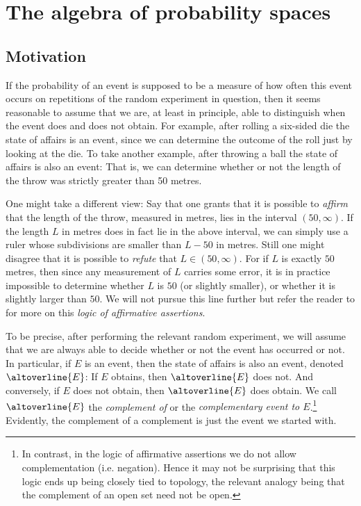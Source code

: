 \documentclass[article, a4paper, 11pt, oneside]{memoir}
\numberwithin{equation}{chapter}
\begin{document}
\chapter{The algebra of probability spaces}

\section{Motivation}

\newcommand{\compl}[1]{\altoverline{#1}}

If the probability of an event is supposed to be a measure of how often this event occurs on repetitions of the random experiment in question, then it seems reasonable to assume that we are, at least in principle, able to distinguish when the event does and does not obtain. For example, after rolling a six-sided die the state of affairs  is an event, since we can determine the outcome of the roll just by looking at the die. To take another example, after throwing a ball the state of affairs  is also an event: That is, we can determine whether or not the length of the throw was strictly greater than 50 metres.

One might take a different view: Say that one grants that it is possible to \emph{affirm} that the length of the throw, measured in metres, lies in the interval $(50,\infty)$. If the length $L$ in metres does in fact lie in the above interval, we can simply use a ruler whose subdivisions are smaller than $L - 50$ in metres. Still one might disagree that it is possible to \emph{refute} that $L \in (50, \infty)$. For if $L$ is exactly $50$ metres, then since any measurement of $L$ carries some error, it is in practice impossible to determine whether $L$ is $50$ (or slightly smaller), or whether it is slightly larger than $50$. We will not pursue this line further but refer the reader to \textcite{vickers1989} for more on this \emph{logic of affirmative assertions}.

To be precise, after performing the relevant random experiment, we will assume that we are always able to decide whether or not the event has occurred or not. In particular, if $E$ is an event, then the state of affairs  is also an event, denoted $\compl{E}$: If $E$ obtains, then $\compl{E}$ does not. And conversely, if $E$ does not obtain, then $\compl{E}$ does obtain. We call $\compl{E}$ the \emph{complement of} or the \emph{complementary event to $E$}.\footnote{In contrast, in the logic of affirmative assertions we do not allow complementation (i.e. negation). Hence it may not be surprising that this logic ends up being closely tied to topology, the relevant analogy being that the complement of an open set need not be open.} Evidently, the complement of a complement is just the event we started with.
\end{document}
